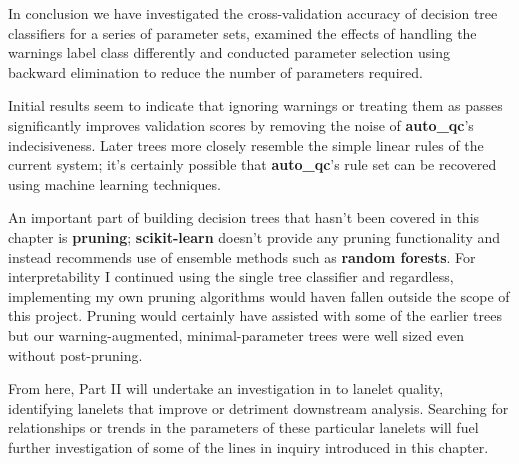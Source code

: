 In conclusion we have investigated the cross-validation accuracy of decision
tree classifiers for a series of parameter sets, examined the effects of
handling the warnings label class differently and conducted parameter selection
using backward elimination to reduce the number of parameters required.

Initial results seem to indicate that ignoring warnings or treating them as
passes significantly improves validation scores by removing the noise of
\textbf{auto\_qc}'s indecisiveness. Later trees more closely resemble
the simple linear rules of the current system; it's certainly possible that
\textbf{auto\_qc}'s rule set can be recovered using machine learning techniques.

An important part of building decision trees that hasn't been covered in this
chapter is \textbf{pruning}; \textbf{scikit-learn} doesn't provide any pruning
functionality and instead recommends use of ensemble methods such as
\textbf{random forests}. For interpretability I continued using the single tree
classifier and regardless, implementing my own pruning algorithms would haven
fallen outside the scope of this project. Pruning would certainly have assisted
with some of the earlier trees but our warning-augmented, minimal-parameter
trees were well sized even without post-pruning.

From here, Part II will undertake an investigation in to lanelet quality,
identifying lanelets that improve or detriment downstream analysis. Searching
for relationships or trends in the parameters of these particular lanelets will
fuel further investigation of some of the lines in inquiry introduced in this
chapter.

